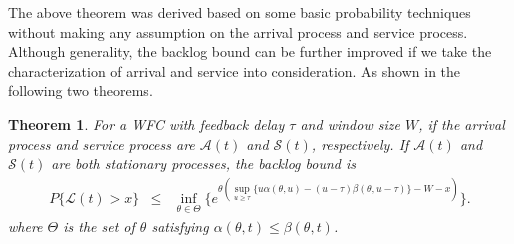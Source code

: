 \documentclass[paper]{ieice}
\newtheorem{theorem}{Theorem}
\begin{document}
The above theorem was derived based on some basic probability techniques without making any assumption on the arrival process and service process. Although generality, the backlog bound can be further improved if we take the characterization of arrival and service into consideration. As shown in the following two theorems.

\begin{theorem}\label{theorem2}
For a WFC with feedback delay $\tau$ and window size $W$, if the arrival process and service process are $\mathcal{A}(t)$ and $\mathcal{S}(t)$, respectively. If $\mathcal{A}(t)$ and $\mathcal{S}(t)$ are both stationary processes, the backlog bound is
\begin{eqnarray*}\label{eqn4}
P\{\mathcal{L}(t)>x\}&\leq& \inf_{\theta\in \Theta}\{e^{\theta(\sup_{u\geq \tau}\{u\alpha(\theta,u)-(u-\tau)\beta(\theta,u-\tau)\}-W-x)}\}.
\end{eqnarray*}
where $\Theta$ is the set of $\theta$ satisfying $\alpha(\theta,t)\leq \beta(\theta,t)$.
\end{theorem}
\end{document}

